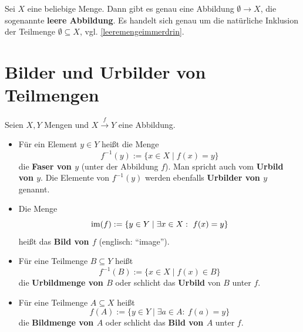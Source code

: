 \begin{defin} 
    Sei $X$ eine beliebige Menge. Dann gibt es genau eine Abbildung $\emptyset\to X$, die sogenannte \textbf{leere Abbildung}. Es handelt sich genau um die natürliche Inklusion der Teilmenge $\emptyset\subseteq X$, vgl. \cref{leeremengeimmerdrin}.
\end{defin}





\section{Bilder und Urbilder von Teilmengen}


\begin{defin} \label{def:bildmenge}   
    Seien $X,Y$ Mengen und $X \xrightarrow{f} Y$ eine Abbildung.
    \begin{itemize}
        \item Für ein Element $y\in Y$ heißt die Menge
            \[ f^{-1}(y) := \{ x\in X \mid f(x)=y \} \]
        die \textbf{Faser von $y$} (unter der Abbildung $f$). Man spricht auch vom \textbf{Urbild von $y$}. Die Elemente von $f^{-1}(y)$ werden ebenfalls \textbf{Urbilder von $y$} genannt.
        \item Die Menge
            \[ \operatorname{im}(f) := \{y\in Y\mid \exists x\in X:\ f(x)=y  \} \]
        heißt das \textbf{Bild von $f$} (englisch: ``image'').
        \item Für eine Teilmenge $B\subseteq Y$ heißt
            \[ f^{-1}(B) := \{ x \in X \mid f(x)\in B \} \]
        die \textbf{Urbildmenge von $B$} oder schlicht das \textbf{Urbild} von $B$ unter $f$.
        \item Für eine Teilmenge $A\subseteq X$ heißt
            \[ f(A) := \{ y \in Y \mid \exists a\in A:\ f(a)=y \} \]
        die \textbf{Bildmenge von $A$} oder schlicht das \textbf{Bild von $A$} unter $f$. 
    \end{itemize}
\end{defin}


